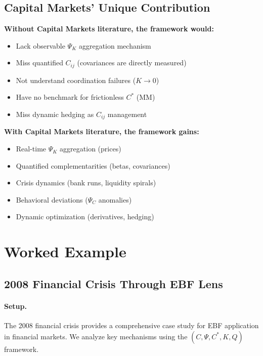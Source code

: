 \subsection{Capital Markets' Unique Contribution}

\textbf{Without Capital Markets literature, the framework would:}
\begin{itemize}
    \item Lack observable $\Psi_K$ aggregation mechanism
    \item Miss quantified $C_{ij}$ (covariances are directly measured)
    \item Not understand coordination failures ($K \to 0$)
    \item Have no benchmark for frictionless $C^*$ (MM)
    \item Miss dynamic hedging as $C_{ij}$ management
\end{itemize}

\textbf{With Capital Markets literature, the framework gains:}
\begin{itemize}
    \item Real-time $\Psi_K$ aggregation (prices)
    \item Quantified complementarities (betas, covariances)
    \item Crisis dynamics (bank runs, liquidity spirals)
    \item Behavioral deviations ($\Psi_C$ anomalies)
    \item Dynamic optimization (derivatives, hedging)
\end{itemize}


\section{Worked Example}
\label{sec:Y-example}

\subsection{2008 Financial Crisis Through EBF Lens}

\paragraph{Setup.}
The 2008 financial crisis provides a comprehensive case study for EBF
application in financial markets. We analyze key mechanisms using the
$(C, \Psi, C^*, K, Q)$ framework.

